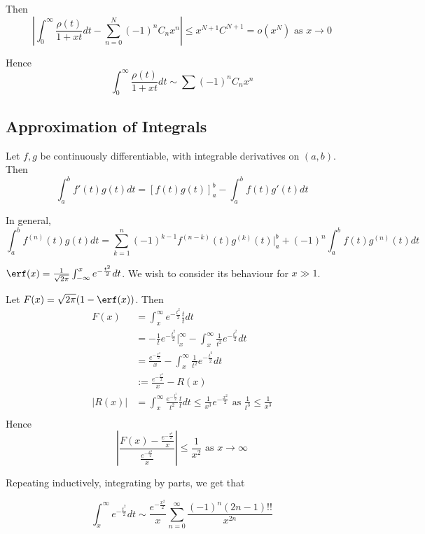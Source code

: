 \documentclass[a4paper]{article}
\begin{document}
Then  \[
	\left| \int_{0}^{\infty}\frac{\rho(t)}{1+xt}dt - \sum_{n=0}^{N}(-1)^{n} C_n x^{n} \right| \le  x^{N+1} C^{N+1} = o(x^{N}) \text{ as } x\to 0
\] 

Hence
\[
	\int_{0}^{\infty} \frac{\rho(t)}{1+xt} dt \sim \sum (-1)^{n} C_n x^{n}
\] 

\subsection{Approximation of Integrals}

\begin{thm}
	Let $f, g$ be continuously differentiable, with integrable derivatives on $(a,b)$. Then
	 \[
		 \int_{a}^{b} f'(t) g(t) dt = \left[ f(t) g(t) \right]_{a}^{b} - \int_{a}^{b} f(t) g'(t) dt 
	\]

	In general,
	\[
	\int_{a}^{b} f^{(n)}(t) g(t)dt = \sum_{k=1}^{n} (-1)^{k-1} f^{(n-k)}(t)g^{(k)}(t) \big\rvert_{a}^{b} + (-1)^{n} \int_{a}^{b} f(t) g^{(n)}(t)dt
	\] 
\end{thm}

 \begin{eg}
	 $\erf(x) = \frac{1}{\sqrt{2\pi}} \int_{-\infty} ^{x} e^{-\frac{t^2}{2}} dt$. We wish to consider its behaviour for $x \gg 1$.

	 Let $F(x) = \sqrt{2\pi} (1-\erf(x) )$. Then
	 \begin{align*}
		 F(x) &= \int_{x}^{\infty} e^{-\frac{t^2}{2}} \frac{t}{t} dt \\
		 &= -\frac{1}{t} e^{-\frac{t^2}{2}} \big\rvert_{x}^{\infty} - \int_{x}^{\infty}\frac{1}{t^2} e^{-\frac{t^2}{2}} dt \\
		 &= \frac{e^{-\frac{x^2}{2}}}{x} - \int_{x}^{\infty} \frac{1}{t^2} e^{-\frac{t^2}{2}}dt \\
		 &:= \frac{e^{-\frac{x^2}{2}}}{x} -R(x) \\
		 |R(x)| &= \int_{x}^{\infty} \frac{e^{-\frac{t^2}{2}}}{t^2} \frac{t}{t}dt \le \frac{1}{x^{3}} e^{-\frac{x^2}{2}} \text{ as } \frac{1}{t^3} \le \frac{1}{x^3} \\
	 \end{align*}
	 Hence
	 \[
	 \left| \frac{F(x) - \frac{e^{-\frac{x^2}{2}}}{x}}{\frac{e^{-\frac{x^2}{2}}}{x}} \right| \le  \frac{1}{x^2} \text{ as } x \to \infty
	 \] 

	 Repeating inductively, integrating by parts, we get that

	 \[
		 \int_{x}^{\infty} e^{-\frac{t^2}{2}} dt \sim \frac{e^{-\frac{x^2}{2}}}{x} \sum_{n=0}^{\infty} \frac{(-1)^{n} (2n-1)!!}{x^{2n}}
	 \] 
\end{eg}
\end{document}
